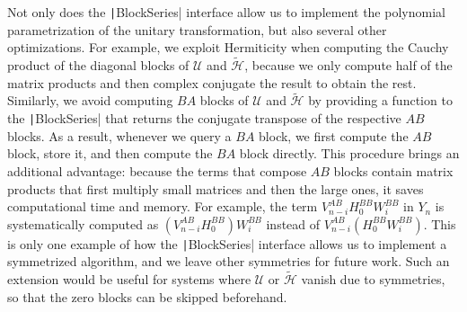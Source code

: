 Not only does the \texttt|BlockSeries| interface allow us to
implement the polynomial parametrization of the unitary transformation, but
also several other optimizations.
For example, we exploit Hermiticity when computing the Cauchy product of the
diagonal blocks of $\mathcal{U}$ and $\tilde{\mathcal{H}}$, because we only
compute half of the matrix products and then complex conjugate the result to
obtain the rest.
Similarly, we avoid computing $BA$ blocks of $\mathcal{U}$ and
$\tilde{\mathcal{H}}$ by providing a function to the \texttt|BlockSeries| that returns
the conjugate transpose of the respective $AB$ blocks.
As a result, whenever we query a $BA$ block, we first compute the $AB$ block,
store it, and then compute the $BA$ block directly.
This procedure brings an additional advantage: because the terms that compose
$AB$ blocks contain matrix products that first multiply small matrices and then
the large ones, it saves computational time and memory.
For example, the term $V_{n -i}^{AB} H_0^{BB}
W_i^{BB}$ in $Y_n$ is systematically computed as $(V_{n -i}^{AB}
H_0^{BB}) W_i^{BB}$ instead of $V_{n -i}^{AB}
(H_0^{BB} W_i^{BB})$.
This is only one example of how the \texttt|BlockSeries| interface allows us to
implement a symmetrized algorithm, and we leave other symmetries for future
work.
Such an extension would be useful for systems where $\mathcal{U}$ or
$\tilde{\mathcal{H}}$ vanish due to symmetries, so that the zero blocks can be
skipped beforehand.

